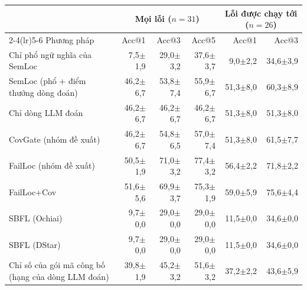 \begin{tabular}{lrrrrr}
\toprule
 & \multicolumn{3}{c}{Mọi lỗi ($n=31$)} & \multicolumn{2}{c}{Lỗi được chạy tới ($n=26$)} \\
\cmidrule(lr){2-4}\cmidrule(lr){5-6}
Phương pháp & Acc@1 & Acc@3 & Acc@5 & Acc@1 & Acc@3 \\
\midrule
Chỉ phổ ngữ nghĩa của SemLoc & 7,5{\scriptsize$\pm$1,9} & 29,0{\scriptsize$\pm$3,2} & 37,6{\scriptsize$\pm$3,7} & 9,0{\scriptsize$\pm$2,2} & 34,6{\scriptsize$\pm$3,9} \\
SemLoc (phổ + điểm thưởng dòng đoán) & 46,2{\scriptsize$\pm$6,7} & 53,8{\scriptsize$\pm$7,4} & 55,9{\scriptsize$\pm$6,7} & 51,3{\scriptsize$\pm$8,0} & 60,3{\scriptsize$\pm$8,9} \\
Chỉ dòng LLM đoán & 46,2{\scriptsize$\pm$6,7} & 46,2{\scriptsize$\pm$6,7} & 46,2{\scriptsize$\pm$6,7} & 51,3{\scriptsize$\pm$8,0} & 51,3{\scriptsize$\pm$8,0} \\
CovGate (nhóm đề xuất) & 46,2{\scriptsize$\pm$6,7} & 54,8{\scriptsize$\pm$6,5} & 57,0{\scriptsize$\pm$7,4} & 51,3{\scriptsize$\pm$8,0} & 61,5{\scriptsize$\pm$7,7} \\
FailLoc (nhóm đề xuất) & 50,5{\scriptsize$\pm$1,9} & 71,0{\scriptsize$\pm$3,2} & 77,4{\scriptsize$\pm$3,2} & 56,4{\scriptsize$\pm$2,2} & 71,8{\scriptsize$\pm$2,2} \\
FailLoc+Cov & 51,6{\scriptsize$\pm$5,6} & 69,9{\scriptsize$\pm$3,7} & 75,3{\scriptsize$\pm$1,9} & 59,0{\scriptsize$\pm$5,9} & 75,6{\scriptsize$\pm$4,4} \\
SBFL (Ochiai) & 9,7{\scriptsize$\pm$0,0} & 29,0{\scriptsize$\pm$0,0} & 29,0{\scriptsize$\pm$0,0} & 11,5{\scriptsize$\pm$0,0} & 34,6{\scriptsize$\pm$0,0} \\
SBFL (DStar) & 9,7{\scriptsize$\pm$0,0} & 29,0{\scriptsize$\pm$0,0} & 29,0{\scriptsize$\pm$0,0} & 11,5{\scriptsize$\pm$0,0} & 34,6{\scriptsize$\pm$0,0} \\
\midrule
Chỉ số của gói mã công bố (hạng của dòng LLM đoán) & 39,8{\scriptsize$\pm$1,9} & 45,2{\scriptsize$\pm$3,2} & 51,6{\scriptsize$\pm$3,2} & 37,2{\scriptsize$\pm$2,2} & 43,6{\scriptsize$\pm$5,9} \\
\bottomrule
\end{tabular}
